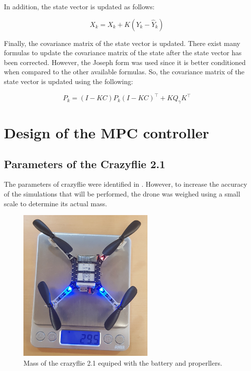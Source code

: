 \documentclass{thesisreport}
\begin{document}
    \newpage
    
    In addition, the state vector is updated as follows:
    
    \begin{equation}
        X_k = X_k + K (Y_k-\hat{Y}_k)
    \end{equation}
    
    Finally, the covariance matrix of the state vector is updated. There exist many formulas to update the covariance matrix of the state after the state vector has been corrected. However, the Joseph form was used since it is better conditioned when compared to the other available formulas. So, the covariance matrix of the state vector is updated using the following: 
    
    \begin{equation}
        P_k = ( I - K C) P_k ( I - K C)^{\intercal} + K Q_{\gamma} K^{\intercal}
    \end{equation}

\section{Design of the MPC controller}

\subsection{Parameters of the Crazyflie 2.1}\label{subsec:parameters_of_the_crazyflie}

The parameters of crazyflie were identified in \cite{Forster2015}. However, to increase the accuracy of the simulations that will be performed, the drone was weighed using a small scale to determine its actual mass.

\begin{figure}[h]
	\centering
	\includegraphics[width=0.6\textwidth, angle =-90]{Images/crazyflie/weight.jpg}
	\caption{Mass of the crazyflie 2.1 equiped with the battery and properllers.}
	\label{fig:crazyflie_weight}
\end{figure}
\end{document}
